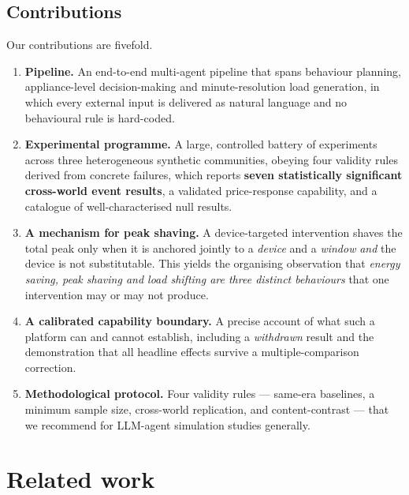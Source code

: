 \documentclass[11pt]{article}
\begin{document}
\subsection{Contributions}
Our contributions are fivefold.
\begin{enumerate}
\item \textbf{Pipeline.} An end-to-end multi-agent pipeline that spans behaviour planning,
appliance-level decision-making and minute-resolution load generation, in which every external input is
delivered as natural language and no behavioural rule is hard-coded.
\item \textbf{Experimental programme.} A large, controlled battery of experiments across three
heterogeneous synthetic communities, obeying four validity rules derived from concrete failures, which
reports \textbf{seven statistically significant cross-world event results}, a validated price-response
capability, and a catalogue of well-characterised null results.
\item \textbf{A mechanism for peak shaving.} A device-targeted intervention shaves the total peak only
when it is anchored jointly to a \emph{device} and a \emph{window} \emph{and} the device is not
substitutable. This yields the organising observation that \emph{energy saving, peak shaving and load
shifting are three distinct behaviours} that one intervention may or may not produce.
\item \textbf{A calibrated capability boundary.} A precise account of what such a platform can and cannot
establish, including a \emph{withdrawn} result and the demonstration that all headline effects survive a
multiple-comparison correction.
\item \textbf{Methodological protocol.} Four validity rules --- same-era baselines, a minimum sample size,
cross-world replication, and content-contrast --- that we recommend for LLM-agent simulation studies
generally.
\end{enumerate}

\section{Related work}
\end{document}
